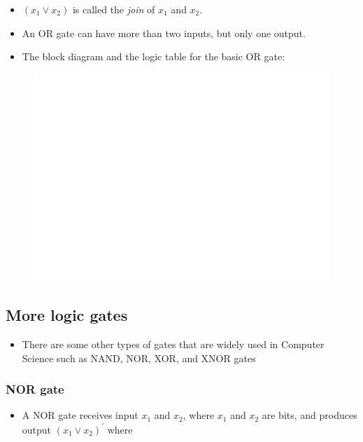 \documentclass[]{book}
\providecommand{\tightlist}{%
  \setlength{\itemsep}{0pt}\setlength{\parskip}{0pt}}
\begin{document}
\begin{itemize}
\tightlist
\item
  \((x_1 \lor x_2)\) is called the \emph{join} of \(x_1\) and \(x_2\).
\item
  An OR gate can have more than two inputs, but only one output.
\item
  The block diagram and the logic table for the basic OR gate:
\end{itemize}

\begin{figure}

{\centering \includegraphics[width=1\linewidth]{figure/boxC43-1} 

}

\end{figure}

\hypertarget{more-logic-gates}{%
\subsection{More logic gates}\label{more-logic-gates}}

\begin{itemize}
\tightlist
\item
  There are some other types of gates that are widely used in Computer Science such as NAND, NOR, XOR, and XNOR gates
\end{itemize}

\hypertarget{nor-gate}{%
\subsubsection{NOR gate}\label{nor-gate}}

\begin{itemize}
\tightlist
\item
  A NOR gate receives input \(x_1\) and \(x_2\), where \(x_1\) and \(x_2\) are bits, and produces output \((x_1 \lor x_2)^\prime\) where
\end{itemize}
\end{document}
